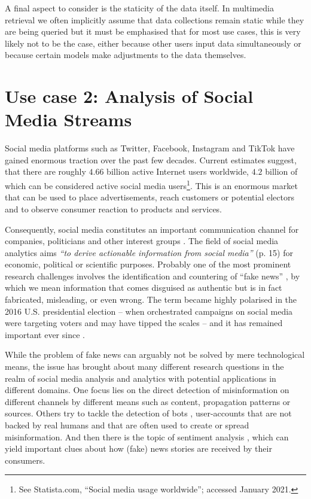 A final aspect to consider is the staticity of the data itself. In multimedia retrieval we often implicitly assume that data collections remain static while they are being queried but it must be emphasised that for most use cases, this is very likely not to be the case, either because other users input data simultaneously or because certain models make adjustments to the data themselves.

\section{Use case 2: Analysis of Social Media Streams}
\label{section:application_online_analysis}

Social media platforms such as Twitter, Facebook, Instagram and TikTok have gained enormous traction over the past few decades. Current estimates suggest, that there are roughly $4.66$ billion active Internet users worldwide, $4.2$ billion of which can be considered active social media users\footnote{See Statista.com, ``Social media usage worldwide''; accessed January 2021.}. This is an enormous market that can be used to place advertisements, reach customers or potential electors and to observe consumer reaction to products and services.

Consequently, social media constitutes an important communication channel for companies, politicians and other interest groups \cite{Barbera:2018New}. The field of social media analytics aims \emph{``to derive actionable information from social media''} \cite{Zheng:2010Social} (p. 15) for economic, political or scientific purposes. Probably one of the most prominent research challenges involves the identification and countering of ``fake news'' \cite{Lazer:2018Science}, by which we mean information that comes disguised as authentic but is in fact fabricated, misleading, or even wrong. The term became highly polarised in the 2016 U.S. presidential election \cite{Quandt:2019Fake} -- when orchestrated campaigns on social media were targeting voters and may have tipped the scales -- and it has remained important ever since \cite{Ferrara:2020Characterizing}.

While the problem of fake news can arguably not be solved by mere technological means, the issue has brought about many different research questions in the realm of social media analysis and analytics with potential applications in different domains. One focus lies on the direct detection of misinformation on different channels by different means such as content, propagation patterns \cite{Zhou:2020Survey} or sources. Others try to tackle the detection of bots \cite{Davis:2016BotOrNot,Cresci:2020Decade}, user-accounts that are not backed by real humans and that are often used to create or spread misinformation. And then there is the topic of sentiment analysis \cite{Yue:2019Survey}, which can yield important clues about how (fake) news stories are received by their consumers.

